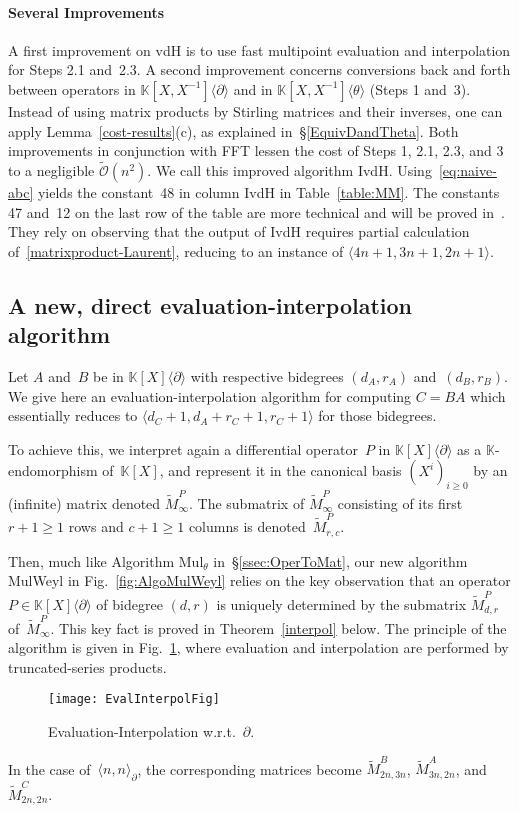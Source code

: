 \documentclass{sig-alt-full}
\newcommand{\x}{X}
\newcommand{\Tx}{\theta}
\newcommand{\Dx}{\partial}
\newcommand{\bigOsoft}{\tilde{\mathcal{O}}}
\def\OMul#1#2#3{\langle #1,#2 \rangle_{#3}}
\def\MMul#1#2#3{\langle #1,#2,#3 \rangle}
\newcommand{\bK}{\mathbb{K}}
\def\tM{\tilde M}
\begin{document}
\paragraph*{Several Improvements} A first improvement on \textsf{vdH} 
is to use fast multipoint evaluation and interpolation for Steps 2.1 and~2.3.
A second improvement concerns conversions back and forth between operators in $\bK[\x,\x^{-1}]\langle \Dx  \rangle$ and in $\bK[\x,\x^{-1}]\langle \Tx  \rangle$ (Steps 1 and~3).
Instead of using matrix products by Stirling matrices and their inverses, one can apply Lemma~\ref{cost-results}(c),
as explained in~\S\ref{EquivDandTheta}.
Both improvements in conjunction with FFT lessen the cost of Steps 1, 2.1, 2.3, and 3 to a negligible $\bigOsoft(n^2)$.
We call this improved algorithm \textsf{IvdH}.
Using~\eqref{eq:naive-abc} yields the constant~48 in column \textsf{IvdH} in Table~\ref{table:MM}.
The constants 47 and~12 on the last row of the table are more technical and will be proved in~\cite{LongVersion}.
They rely on observing that the output of \textsf{IvdH} requires partial calculation of~\eqref{matrixproduct-Laurent}, reducing to an instance of $\MMul{4n+1}{3n+1}{2n+1}$.



\subsection{A new, direct evaluation-interpolation algorithm}
\label{sec:MulWeyl}

Let $A$ and~$B$ be in  $\bK[\x]\langle \Dx \rangle$ with respective bidegrees $(d_A,r_A)$ and~$(d_B,r_B)$.
We give here an evaluation-inter\-pol\-ation algorithm for computing $C = BA$ which essentially reduces to $\MMul{d_C+1}{d_A + r_C +1}{r_C+1}$ for those bidegrees.

To achieve this, we interpret again a differential operator~$P$ in $\bK[\x]\langle\Dx\rangle$ as a $\bK$-endomorphism of~$\bK[\x]$, and represent it in the canonical basis $(\x^i)_{i \geq 0}$ by an (infinite) matrix  denoted $\tM_\infty^P$.
The submatrix of $\tM_\infty^P$ consisting of its first $r+1\geq 1$ rows and $c+1\geq 1$ columns is denoted~$\tM_{r,c}^P$.

Then, much like Algorithm \textsf{Mul}${}_\Tx$ in~\S\ref{ssec:OperToMat}, our new algorithm \textsf{MulWeyl} in Fig.~\ref{fig:AlgoMulWeyl} relies on the key observation that an operator $P \in \bK[\x]\langle \Dx \rangle$ of bidegree $(d,r)$ is uniquely determined by the submatrix $\tM_{d,r}^P$ of~$\tM^P_\infty$.
This key fact is proved in Theorem~\ref{interpol} below.
The principle of the algorithm is given in Fig.~\ref{fig:EvalInterp}, where evaluation and interpolation are performed by truncated-series products.
\begin{figure}[h]
\begin{center}
\texttt{[image: EvalInterpolFig]}
\end{center}
\caption{\label{fig:EvalInterp} Evaluation-Interpolation w.r.t.~$\Dx$.}
\end{figure}
In the case of~$\OMul nn\Dx$, the corresponding matrices become $\tM^B_{2n,3n}$, $\tM^A_{3n,2n}$, and $\tM^C_{2n,2n}$.
\end{document}
